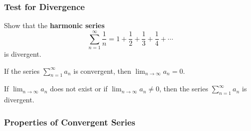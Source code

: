 \subsubsection*{Test for Divergence}
\begin{problem}
    Show that the \textbf{harmonic series}
    \[\sum_{n=1}^\infty \frac{1}{n}=1+\frac{1}{2}+\frac{1}{3}+\frac{1}{4}
    +\cdots\]
    is divergent.
\end{problem}
\begin{theorem}
    If the series \(\displaystyle{\sum_{n=1}^\infty a_n}\) is convergent, then
    \(\displaystyle{\lim_{n\to\infty}a_n=0}\).
\end{theorem}
\begin{theorem}
    If \(\displaystyle{\lim_{n\to\infty}a_n}\) does not exist or if
    \(\displaystyle{\lim_{n\to\infty}a_n\neq 0}\), then the series
    \(\displaystyle{\sum_{n=1}^\infty a_n}\) is divergent.
\end{theorem}

\subsubsection*{Properties of Convergent Series}